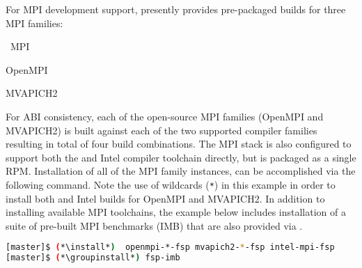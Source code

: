 For MPI development support, \FSP{} presently provides pre-packaged builds for
three MPI families: 

\begin{itemize*}
\item \Intel{}~MPI
\item OpenMPI
\item MVAPICH2
\end{itemize*}
 For ABI consistency, each of the open-source MPI families (OpenMPI and
 MVAPICH2) is built against each of the two supported compiler families
 resulting in total of four build combinations.  The \Intel{} MPI stack is also
 configured to support both the \GNU{} and Intel compiler toolchain directly, but
 is packaged as a single RPM. Installation of all of the MPI family instances,
 can be accomplished via the following command. Note the use of wildcards
 (\texttt{*}) in this example in order to install both \GNU{} and Intel builds for
 OpenMPI and MVAPICH2. In addition to installing available MPI toolchains,
 the example below includes installation of a suite of pre-built MPI
 benchmarks (IMB) that are also provided via \FSP{}.

\begin{lstlisting}[language=bash]
[master]$ (*\install*)  openmpi-*-fsp mvapich2-*-fsp intel-mpi-fsp
[master]$ (*\groupinstall*) fsp-imb
\end{lstlisting}
